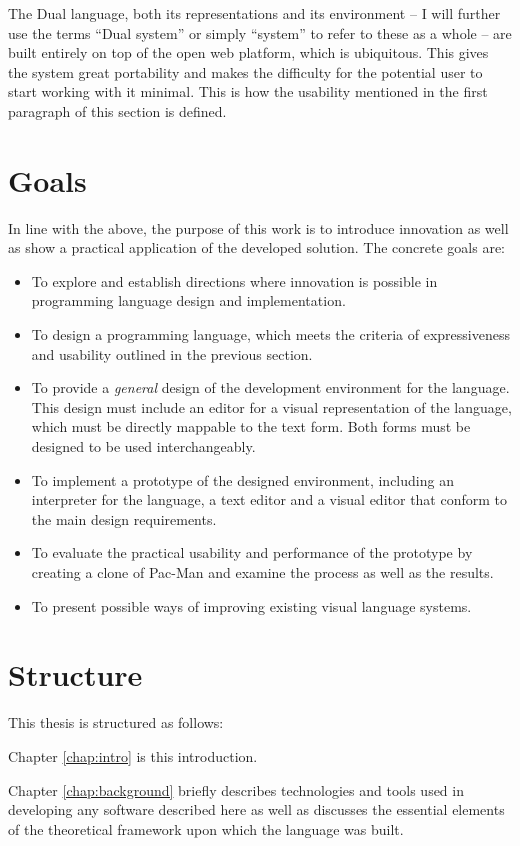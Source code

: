 The Dual language, both its representations and its environment -- I will further use the terms ``Dual system'' or simply ``system'' to refer to these as a whole -- are built entirely on top of the open web platform\cite{open_web_platform}, which is ubiquitous. This gives the system great portability and makes the difficulty for the potential user to start working with it minimal. This is how the usability mentioned in the first paragraph of this section is defined.

\section{Goals}
In line with the above, the purpose of this work is to introduce innovation as well as show a practical application of the developed solution. The concrete goals are:
\begin{itemize}
	\item To explore and establish directions where innovation is possible in programming language design and implementation.
	\item To design a programming language, which meets the criteria of expressiveness and usability outlined in the previous section.
	\item To provide a \textit{general} design of the development environment for the language. This design must include an editor for a visual representation of the language, which must be directly mappable to the text form. Both forms must be designed to be used interchangeably.
    \item To implement a prototype of the designed environment, including an interpreter for the language, a text editor and a visual editor that conform to the main design requirements.
    \item To evaluate the practical usability and performance of the prototype by creating a clone of Pac-Man and examine the process as well as the results.
    \item To present possible ways of improving existing visual language systems.
\end{itemize}

\section{Structure}
This thesis is structured as follows:

Chapter \ref{chap:intro} is this introduction.

Chapter \ref{chap:background} briefly describes technologies and tools used in developing any software described here as well as discusses the essential elements of the theoretical framework upon which the language was built.

